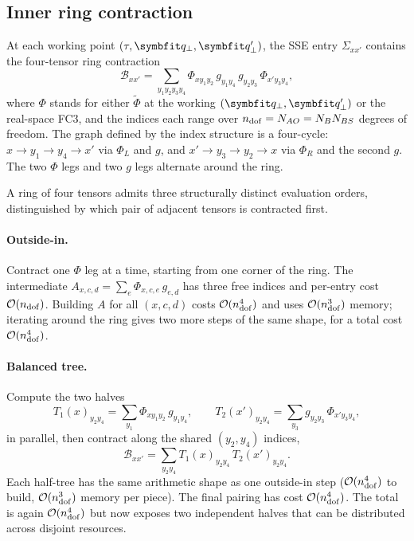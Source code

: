 \subsection{Inner ring contraction}
\label{ssec:phph_ring}

At each working point $(\tau,\qp,\qp')$, the SSE entry $\Sigma_{xx'}$
contains the four-tensor ring contraction
\begin{equation}\label{eq:inner_contraction}
  \mathcal{B}_{xx'}
  = \sum_{y_1y_2y_3y_4}
    \Phi_{xy_1y_2}\,g_{y_1y_4}\,g_{y_2y_3}\,\Phi_{x'y_3y_4},
\end{equation}
where $\Phi$ stands for either $\tilde\Phi$ at the working
$(\qp,\qp')$ or the real-space FC3, and the indices each range over
$n_{\mathrm{dof}} = N_{AO} = N_{B}N_{BS}$ degrees of freedom. The graph defined by
the index structure is a four-cycle: $x \to y_1 \to y_4 \to x'$ via
$\Phi_L$ and $g$, and $x' \to y_3 \to y_2 \to x$ via $\Phi_R$ and the
second $g$. The two $\Phi$ legs and two $g$ legs alternate around
the ring.

A ring of four tensors admits
three structurally distinct evaluation orders, distinguished by
which pair of adjacent tensors is contracted first.

\paragraph{Outside-in.} Contract one $\Phi$ leg at a time, starting
from one corner of the ring. The intermediate $A_{x,c,d} = \sum_{e}
\Phi_{x,c,e}\,g_{e,d}$ has three free indices and per-entry cost
$\mathcal{O}(n_{\mathrm{dof}})$. Building $A$ for all $(x,c,d)$ costs $\mathcal{O}(n_{\mathrm{dof}}^{4})$
and uses $\mathcal{O}(n_{\mathrm{dof}}^{3})$ memory; iterating around the ring gives
two more steps of the same shape, for a total cost
$\mathcal{O}(n_{\mathrm{dof}}^{4})$.

\paragraph{Balanced tree.} Compute the two halves
\begin{equation}\label{eq:balanced_tree}
  T_1(x)_{y_2y_4}
  = \sum_{y_1}\Phi_{xy_1y_2}\,g_{y_1y_4},
  \qquad
  T_2(x')_{y_2y_4}
  = \sum_{y_3}g_{y_2y_3}\,\Phi_{x'y_3y_4},
\end{equation}
in parallel, then contract along the shared $(y_2,y_4)$
indices,
\begin{equation}\label{eq:balanced_pair}
  \mathcal{B}_{xx'}
  = \sum_{y_2y_4}
    T_1(x)_{y_2y_4}\,T_2(x')_{y_2y_4}.
\end{equation}
Each half-tree has the same arithmetic shape as one outside-in step
($\mathcal{O}(n_{\mathrm{dof}}^{4})$ to build, $\mathcal{O}(n_{\mathrm{dof}}^{3})$ memory per piece). The
final pairing has cost $\mathcal{O}(n_{\mathrm{dof}}^{4})$. The total is again
$\mathcal{O}(n_{\mathrm{dof}}^{4})$ but now exposes two independent halves that can be
distributed across disjoint resources.


